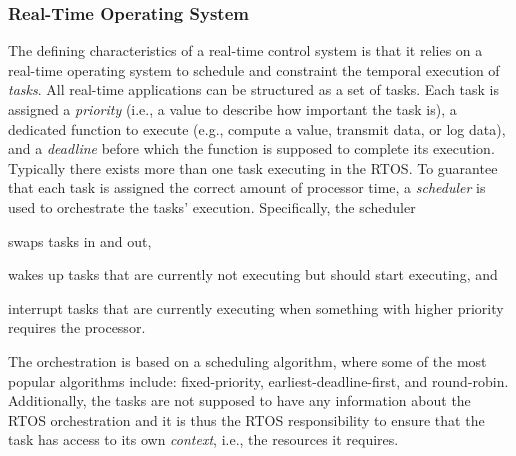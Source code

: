 \subsubsection{Real-Time Operating System}%
%
The defining characteristics of a real-time control system is that it relies on a real-time operating system to schedule and constraint the temporal execution of \emph{tasks}. 
All real-time applications can be structured as a set of tasks.
Each task is assigned a \emph{priority} (i.e., a value to describe how important the task is), a dedicated function to execute (e.g., compute a value, transmit data, or log data), and a \emph{deadline} before which the function is supposed to complete its execution.
Typically there exists more than one task executing in the RTOS.
To guarantee that each task is assigned the correct amount of processor time, a \emph{scheduler} is used to orchestrate the tasks' execution.
Specifically, the scheduler
\begin{enumerate*}[label = (\roman*)]
    \item swaps tasks in and out,
    \item wakes up tasks that are currently not executing but should start executing, and
    \item interrupt tasks that are currently executing when something with higher priority requires the processor.
\end{enumerate*}
The orchestration is based on a scheduling algorithm, where some of the most popular algorithms include: fixed-priority, earliest-deadline-first, and round-robin.
Additionally, the tasks are not supposed to have any information about the RTOS orchestration and it is thus the RTOS responsibility to ensure that the task has access to its own \emph{context}, i.e., the resources it requires. 

